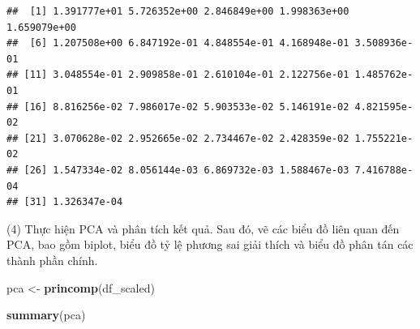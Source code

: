 \documentclass[
]{article}
\newenvironment{Shaded}{\begin{snugshade}}{\end{snugshade}}
\newcommand{\FunctionTok}[1]{\textcolor[rgb]{0.13,0.29,0.53}{\textbf{#1}}}
\newcommand{\NormalTok}[1]{#1}
\newcommand{\OtherTok}[1]{\textcolor[rgb]{0.56,0.35,0.01}{#1}}
\begin{document}
\begin{verbatim}
##  [1] 1.391777e+01 5.726352e+00 2.846849e+00 1.998363e+00 1.659079e+00
##  [6] 1.207508e+00 6.847192e-01 4.848554e-01 4.168948e-01 3.508936e-01
## [11] 3.048554e-01 2.909858e-01 2.610104e-01 2.122756e-01 1.485762e-01
## [16] 8.816256e-02 7.986017e-02 5.903533e-02 5.146191e-02 4.821595e-02
## [21] 3.070628e-02 2.952665e-02 2.734467e-02 2.428359e-02 1.755221e-02
## [26] 1.547334e-02 8.056144e-03 6.869732e-03 1.588467e-03 7.416788e-04
## [31] 1.326347e-04
\end{verbatim}

\hfill\break
(4) Thực hiện PCA và phân tích kết quả. Sau đó, vẽ các biểu đồ liên quan
đến PCA, bao gồm biplot, biểu đồ tỷ lệ phương sai giải thích và biểu đồ
phân tán các thành phần chính.

\begin{Shaded}
\begin{Highlighting}[]
\NormalTok{pca }\OtherTok{\textless{}{-}} \FunctionTok{princomp}\NormalTok{(df\_scaled)}

\FunctionTok{summary}\NormalTok{(pca)}
\end{Highlighting}
\end{Shaded}
\end{document}
